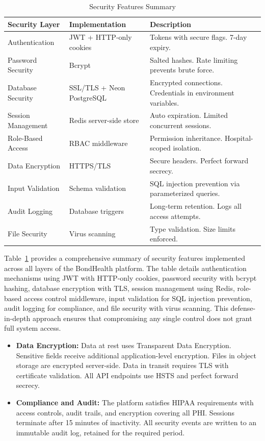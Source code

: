 \begin{table}[H]
\small
\centering
\caption{Security Features Summary}
\label{tab:ch4-security}
\renewcommand{\arraystretch}{1.3}
\begin{tabular}{|>{\raggedright\arraybackslash}p{2.8cm}|>{\raggedright\arraybackslash}p{3.8cm}|>{\raggedright\arraybackslash}p{6.8cm}|}
\hline
\textbf{Security Layer} & \textbf{Implementation} & \textbf{Description} \\
\hline
Authentication & JWT + HTTP-only cookies & Tokens with secure flags. 7-day expiry. \\
\hline
Password Security & Bcrypt & Salted hashes. Rate limiting prevents brute force. \\
\hline
Database Security & SSL/TLS + Neon PostgreSQL & Encrypted connections. Credentials in environment variables. \\
\hline
Session Management & Redis server-side store & Auto expiration. Limited concurrent sessions. \\
\hline
Role-Based Access & RBAC middleware & Permission inheritance. Hospital-scoped isolation. \\
\hline
Data Encryption & HTTPS/TLS & Secure headers. Perfect forward secrecy. \\
\hline
Input Validation & Schema validation & SQL injection prevention via parameterized queries. \\
\hline
Audit Logging & Database triggers & Long-term retention. Logs all access attempts. \\
\hline
File Security & Virus scanning & Type validation. Size limits enforced. \\
\hline
\end{tabular}
\end{table}
\noindent Table~\ref{tab:ch4-security} provides a comprehensive summary of security features implemented across all layers of the BondHealth platform. The table details authentication mechanisms using JWT with HTTP-only cookies, password security with bcrypt hashing, database encryption with TLS, session management using Redis, role-based access control middleware, input validation for SQL injection prevention, audit logging for compliance, and file security with virus scanning. This defense-in-depth approach ensures that compromising any single control does not grant full system access.
\FloatBarrier

\begin{itemize}
    \item \textbf{Data Encryption:} Data at rest uses Transparent Data Encryption. Sensitive fields receive additional application-level encryption. Files in object storage are encrypted server-side. Data in transit requires TLS with certificate validation. All API endpoints use HSTS and perfect forward secrecy.

    \item \textbf{Compliance and Audit:} The platform satisfies HIPAA requirements with access controls, audit trails, and encryption covering all PHI. Sessions terminate after 15 minutes of inactivity. All security events are written to an immutable audit log, retained for the required period.
\end{itemize}

